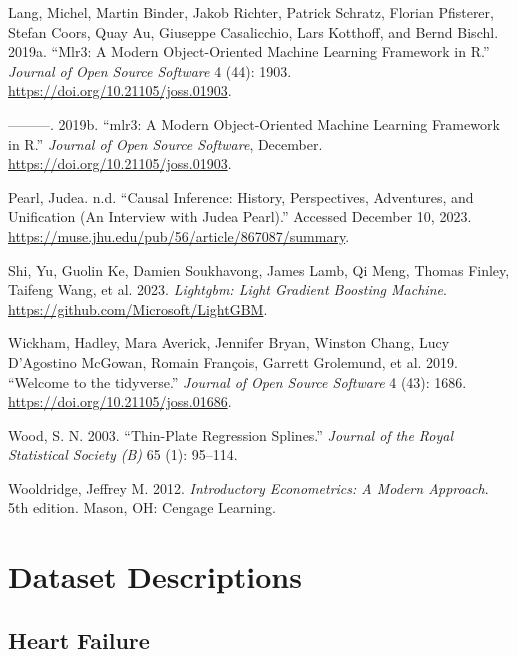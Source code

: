\documentclass[
  letterpaper,
]{krantz}
\newlength{\cslhangindent}
\newlength{\cslentryspacingunit} %
\newenvironment{CSLReferences}[2] %
 {%
  \setlength{\parindent}{0pt}
  \ifodd #1
  \let\oldpar\par
  \def\par{\hangindent=\cslhangindent\oldpar}
  \fi
  \setlength{\parskip}{#2\cslentryspacingunit}
 }%
 {}
\begin{document}
\begin{CSLReferences}{1}{0}
\leavevmode{}%
Lang, Michel, Martin Binder, Jakob Richter, Patrick Schratz, Florian
Pfisterer, Stefan Coors, Quay Au, Giuseppe Casalicchio, Lars Kotthoff,
and Bernd Bischl. 2019a. {``Mlr3: {A} Modern Object-Oriented Machine
Learning Framework in {R}.''} \emph{Journal of Open Source Software} 4
(44): 1903. \url{https://doi.org/10.21105/joss.01903}.

\leavevmode{}%
---------. 2019b. {``{mlr3}: A Modern Object-Oriented Machine Learning
Framework in {R}.''} \emph{Journal of Open Source Software}, December.
\url{https://doi.org/10.21105/joss.01903}.

\leavevmode{}%
Pearl, Judea. n.d. {``Causal {Inference}: {History}, {Perspectives},
{Adventures}, and {Unification} ({An} {Interview} with {Judea}
{Pearl}).''} Accessed December 10, 2023.
\url{https://muse.jhu.edu/pub/56/article/867087/summary}.

\leavevmode{}%
Shi, Yu, Guolin Ke, Damien Soukhavong, James Lamb, Qi Meng, Thomas
Finley, Taifeng Wang, et al. 2023. \emph{Lightgbm: Light Gradient
Boosting Machine}. \url{https://github.com/Microsoft/LightGBM}.

\leavevmode{}%
Wickham, Hadley, Mara Averick, Jennifer Bryan, Winston Chang, Lucy
D'Agostino McGowan, Romain François, Garrett Grolemund, et al. 2019.
{``Welcome to the {tidyverse}.''} \emph{Journal of Open Source Software}
4 (43): 1686. \url{https://doi.org/10.21105/joss.01686}.

\leavevmode{}%
Wood, S. N. 2003. {``Thin-Plate Regression Splines.''} \emph{Journal of
the Royal Statistical Society (B)} 65 (1): 95--114.

\leavevmode{}%
Wooldridge, Jeffrey M. 2012. \emph{Introductory {Econometrics}: {A}
{Modern} {Approach}}. 5th edition. Mason, OH: Cengage Learning.

\end{CSLReferences}

\chapter{Dataset Descriptions}\label{sec-data-descript}

\section{Heart Failure}\label{sec-dd-hear-failure}
\end{document}
